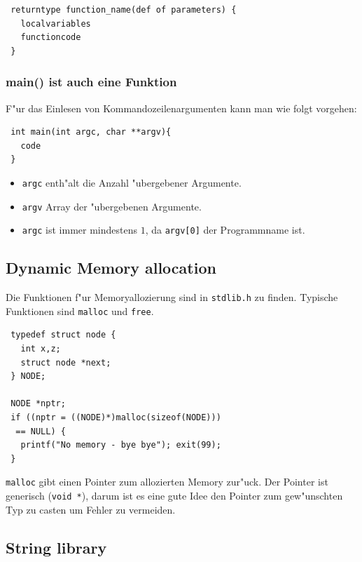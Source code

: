 \documentclass[german, 10pt, a4paper, twocolumn]{scrartcl}
\begin{document}
\begin{verbatim}
 returntype function_name(def of parameters) {
   localvariables
   functioncode
 }
\end{verbatim}

\subsubsection{main() ist auch eine Funktion}

F"ur das Einlesen von Kommandozeilenargumenten kann man wie folgt vorgehen:
\begin{verbatim}
 int main(int argc, char **argv){
   code
 }
\end{verbatim}

\begin{itemize}
	\item \verb#argc# enth"alt die Anzahl "ubergebener Argumente.
	\item \verb#argv# Array der "ubergebenen Argumente.
	\item \verb#argc# ist immer mindestens $1$, da \verb#argv[0]# der Programmname ist.
\end{itemize}

\subsection{Dynamic Memory allocation}

Die Funktionen f"ur Memoryallozierung sind in \verb#stdlib.h# zu finden. Typische Funktionen sind \verb#malloc# und \verb#free#.

\begin{verbatim}
 typedef struct node {
   int x,z;
   struct node *next;
 } NODE;

 NODE *nptr;
 if ((nptr = ((NODE)*)malloc(sizeof(NODE)))
  == NULL) {
   printf("No memory - bye bye"); exit(99);
 }
\end{verbatim}

\verb#malloc# gibt einen Pointer zum allozierten Memory zur"uck. Der Pointer ist generisch (\verb#void *#), darum ist es eine gute Idee den Pointer zum gew"unschten Typ zu casten um Fehler zu vermeiden.

\subsection{String library}
\end{document}
